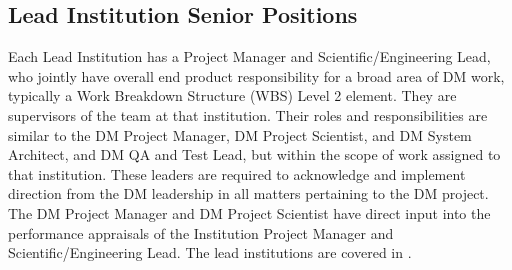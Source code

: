 \subsection{Lead Institution Senior Positions}
Each Lead Institution has a Project Manager and Scientific/Engineering Lead, who jointly have overall end product responsibility for a broad area of DM work, typically a Work Breakdown Structure (WBS) Level 2 element. They are supervisors of the team at that institution.  Their roles and responsibilities are similar to the DM Project Manager, DM Project Scientist, and DM System Architect, and DM QA and Test Lead, but within the scope of work assigned to that institution.  These leaders are required to acknowledge and implement direction from the DM leadership in all matters pertaining to the DM project.  The DM Project Manager and DM Project Scientist have direct input into the performance appraisals of the Institution Project Manager and Scientific/Engineering Lead. 
The lead institutions are covered  in .

